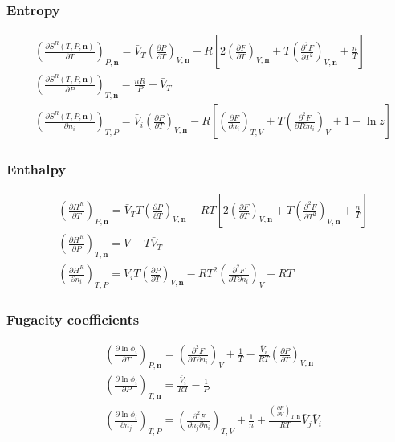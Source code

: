 \documentclass[english]{../thermomemo/thermomemo}
\newcommand*{\pder}[2]{\left(\frac{\partial #1}{\partial #2}\right)}
\newcommand*{\pdder}[2]{\left(\frac{\partial^2 #1}{\partial #2^2}\right)}
\newcommand*{\pdcross}[3]{\left(\frac{\partial^2 #1}{\partial #2 \partial #3}\right)}
\numberwithin{equation}{section}
\begin{document}
\subsubsection*{Entropy}
\begin{align}
  \label{eq:S^R_T}
  & \pder{S^R(T,P,\textbf{n})}{T}_{P,\textbf{n}} = \bar{V}_T \pder{P}{T}_{V,\textbf{n}} - R \left[2\pder{F}{T}_{V,\textbf{n}} + T \pdder{F}{T}_{V,\textbf{n}} + \frac{n}{T} \right] \\
  \label{eq:S^R_P}
  & \pder{S^R(T,P,\textbf{n})}{P}_{T,\textbf{n}} = \frac{nR}{P} - \bar{V}_T \\
  \label{eq:S^R_i}
  & \pder{S^R(T,P,\textbf{n})}{n_i}_{T,P} = \bar{V}_i
  \pder{P}{T}_{V,\textbf{n}} - R\left[ \pder{F}{n_i}_{T,V} +
    T\pdcross{F}{T}{n_i}_V + 1 - \ln z \right]
\end{align}

\subsubsection*{Enthalpy}
\begin{align}
  \label{eq:H^R_T}
  & \pder{H^R}{T}_{P, \textbf{n}} = \bar{V}_T T \pder{P}{T}_{V,\textbf{n}} - RT \left[ 2\pder{F}{T}_{V,\textbf{n}} + T \pdder{F}{T}_{V,\textbf{n}} + \frac{n}{T} \right] \\
  \label{eq:H^R_P}
  & \pder{H^R}{P}_{T, \textbf{n}} = V - T \bar{V}_T \\
  \label{eq:H^R_i}
  & \pder{H^R}{n_i}_{T,P} = \bar{V}_i T \pder{P}{T}_{V,\textbf{n}}
  -RT^2 \pdcross{F}{T}{n_i}_V - RT
\end{align}

\subsubsection*{Fugacity coefficients}
\begin{align}
  \label{eq:lnphi_T}
  & \pder{\ln \phi_i}{T}_{P, \textbf{n}} = \pdcross{F}{T}{n_i}_V + \frac{1}{T} - \frac{\bar{V}_i}{RT}  \pder{P}{T}_{V,\textbf{n}} \\
  \label{eq:lnphi_P}
  & \pder{\ln \phi_i}{P}_{T, \textbf{n}} = \frac{\bar{V}_i}{RT} - \frac{1}{P} \\
  \label{eq:lnphi_i}
  & \pder{\ln \phi_i}{n_j}_{T, P} = \pdcross{F}{n_j}{n_i}_{T,V} +
  \frac{1}{n} + \frac{\pder{P}{V}_{T,\textbf{n}}}{RT} \bar{V}_j
  \bar{V}_i
\end{align}
\end{document}
